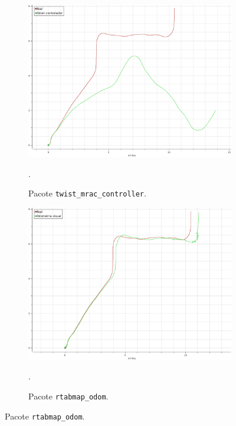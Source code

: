 \documentclass[repeatfields,xlists,xpacks,oneside,yearsonly]{ufrgscca}
\begin{document}
\begin{figure}[h]
    \caption{Sistemas de odometria}
    \begin{subfigure}{0.5\linewidth}
        {
            \centering
            \caption{Pacote \texttt{twist\_mrac\_controller}.}
            \label{fig:odom_controller}
            \includegraphics[width=0.98\linewidth]{odom-controlador.png}\\
        }
        {.}
    \end{subfigure}
    \begin{subfigure}{0.5\linewidth}
    {
        \centering
        \caption{Pacote \texttt{rtabmap\_odom}.}
        \label{fig:odom_visual}
        \includegraphics[width=0.98\linewidth]{odom-visual.png}\\
    }
    {.}
    \end{subfigure}
\end{figure}
\end{document}
